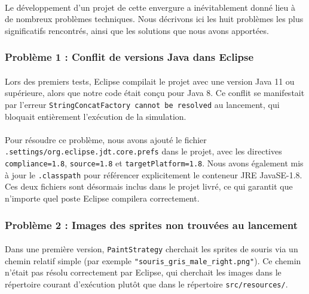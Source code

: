 \paragraph{} Le développement d'un projet de cette envergure a inévitablement donné lieu à de nombreux problèmes techniques. Nous décrivons ici les huit problèmes les plus significatifs rencontrés, ainsi que les solutions que nous avons apportées.

\subsubsection{Problème 1 : Conflit de versions Java dans Eclipse}

\paragraph{} Lors des premiers tests, Eclipse compilait le projet avec une version Java 11 ou supérieure, alors que notre code était conçu pour Java 8. Ce conflit se manifestait par l'erreur \texttt{StringConcatFactory cannot be resolved} au lancement, qui bloquait entièrement l'exécution de la simulation.

\paragraph{} Pour résoudre ce problème, nous avons ajouté le fichier \texttt{.settings/org.eclipse.jdt.core.prefs} dans le projet, avec les directives \texttt{compliance=1.8}, \texttt{source=1.8} et \texttt{targetPlatform=1.8}. Nous avons également mis à jour le \texttt{.classpath} pour référencer explicitement le conteneur JRE JavaSE-1.8. Ces deux fichiers sont désormais inclus dans le projet livré, ce qui garantit que n'importe quel poste Eclipse compilera correctement.

\subsubsection{Problème 2 : Images des sprites non trouvées au lancement}

\paragraph{} Dans une première version, \texttt{PaintStrategy} cherchait les sprites de souris via un chemin relatif simple (par exemple \texttt{"souris\_gris\_male\_right.png"}). Ce chemin n'était pas résolu correctement par Eclipse, qui cherchait les images dans le répertoire courant d'exécution plutôt que dans le répertoire \texttt{src/resources/}.

